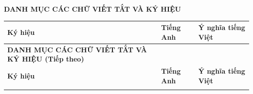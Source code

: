 \clearpage
{}
{}

\begin{center}
{\fontsize{16pt}{20pt}\selectfont \bfseries DANH MỤC CÁC CHỮ VIẾT TẮT VÀ KÝ HIỆU\par}
\vspace{0.4cm}
\end{center}

\begingroup
{}
\small
\setlength{\tabcolsep}{4pt}
\begin{longtable}{>{\bfseries}p{2.0cm} >{\raggedright\arraybackslash}p{6.8cm} >{\raggedright\arraybackslash}p{6.4cm}}
\hline
\textbf{Ký hiệu} & \textbf{Tiếng Anh} & \textbf{Ý nghĩa tiếng Việt} \\
\hline
\endfirsthead

\multicolumn{3}{c}%
{{\bfseries DANH MỤC CÁC CHỮ VIẾT TẮT VÀ KÝ HIỆU (Tiếp theo)}} \\
\hline
\textbf{Ký hiệu} & \textbf{Tiếng Anh} & \textbf{Ý nghĩa tiếng Việt} \\
\hline
\endhead

\hline
\endfoot

\hline
\endlastfoot


\end{longtable}
